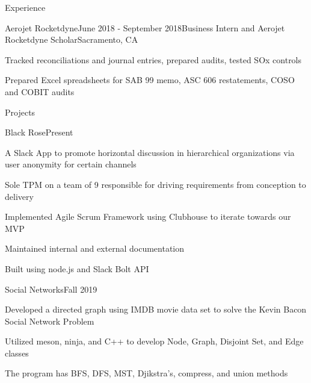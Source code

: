\documentclass{resume} %
\newcommand{\tab}[1]{\hspace{.2667\textwidth}\rlap{#1}}
\newcommand{\itab}[1]{\hspace{0em}\rlap{#1}}
\begin{document}
\begin{rSection}{\faCode{ }}{Experience}
\begin{rSubsection}{}{Aerojet Rocketdyne}{June 2018 - September 2018}{Business Intern and Aerojet Rocketdyne Scholar}{Sacramento, CA}
\item Tracked reconciliations and journal entries, prepared audits, tested SOx controls
\item Prepared Excel spreadsheets for SAB 99 memo, ASC 606 restatements, COSO and COBIT audits
\end{rSubsection}

\end{rSection}

\iffalse
\begin{rSection}{}{Relevant Coursework}
\itab{Algorithm \& Systems Analysis} \tab{}  \tab{Computer Organization \& Systems Programs} 
\\ \itab{Data Structures \& OO Design} \tab{}  \tab{Financial \& Managerial Accounting} 
\\ \itab{Udemy coursework in HTML/CSS for Web Design} \tab{} \tab{Udemy coursework in Python for Financial Analysis}
\end{rSection}
\fi


\begin{rSection}{\faDatabase{ }}{Projects} 

\begin{rSubsection}{}{Black Rose}{Present}{}{}
\item A Slack App to promote horizontal discussion in hierarchical organizations via user anonymity for certain channels
\item Sole TPM on a team of 9 responsible for driving requirements from conception to delivery
\item Implemented Agile Scrum Framework using Clubhouse to iterate towards our MVP
\item Maintained internal and external documentation
\item Built using node.js and Slack Bolt API
\end{rSubsection}

\begin{rSubsection}{}{Social Networks}{Fall 2019}{}{}
\item Developed a directed graph using IMDB movie data set to solve the Kevin Bacon Social Network Problem
\item Utilized meson, ninja, and C++ to develop Node, Graph, Disjoint Set, and Edge classes
\item The program has BFS, DFS, MST, Djikstra's, compress, and union methods
\end{rSubsection}
\end{rSection}
\end{document}
